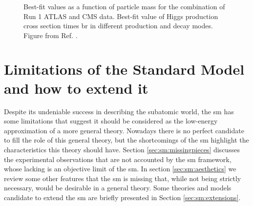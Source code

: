 \begin{figure}[ht]
\centering
{}
\caption{ Best-fit values as a function of particle mass for the combination of Run 1 ATLAS and CMS data.  Best-fit value of Higgs production cross section times \gls{br} in different production and decay modes. Figure from Ref.  \cite{Khachatryan:2016vau}.}
\label{fig:sm:h_couplings_mass}
\end{figure}

 


\section{Limitations of the Standard Model and how to extend it}
\label{sec:smsusy:bsm}

Despite its undeniable success in describing the subatomic world, the \gls{sm} has some limitations that suggest it should be considered as the low-energy approximation of a more general theory. Nowadays there is no perfect candidate to fill the role of this general theory, but the shortcomings of the \gls{sm} highlight the characteristics this theory should have. Section \ref{sec:sm:missingpieces} discusses the experimental observations that are not accounted by the \gls{sm} framework, whose lacking is an objective limit of the \gls{sm}. In section \ref{sec:sm:aesthetics} we review some other features that the \gls{sm} is missing that, while not being strictly necessary, would be desirable in a general theory. Some theories and models candidate to extend the \gls{sm} are briefly presented in Section \ref{sec:sm:extensions}.

